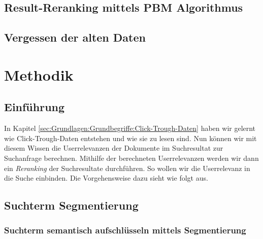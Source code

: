 \subsection{Result-Reranking mittels PBM Algorithmus}
\label{sec:Reranking:Methodik:Result-RerankingPBM}

\subsection{Vergessen der alten Daten}
\label{sec:Reranking:Methodik:Vergessen}


\section{Methodik}
\label{sec:Reranking:Methodik}

\subsection{Einführung}
\label{sec:Reranking:Methodik:Einfuehrung}

In Kapitel \ref{sec:Grundlagen:Grundbegriffe:Click-Trough-Daten} haben wir gelernt wie Click-Trough-Daten entstehen und wie sie zu lesen sind. Nun können wir mit diesem Wissen die Userrelevanzen der Dokumente im Suchresultat zur Suchanfrage berechnen. Mithilfe der berechneten Userrelevanzen werden wir dann ein \textit{Reranking} der Suchresultate durchführen. So wollen wir die Userrelevanz in die Suche einbinden. Die Vorgehensweise dazu sieht wie folgt aus.

\subsection{Suchterm Segmentierung}
\label{sec:Reranking:Methodik:SuchtermSegmentierung}

\subsubsection{Suchterm semantisch aufschlüsseln mittels Segmentierung}
\label{sec:Reranking:Methodik:SuchtermSegmentierung:SuchtermSegmentierung}

